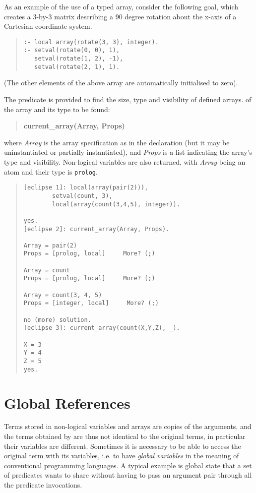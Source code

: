 As an example of the use of a typed array, consider the following goal, which
creates a 3-by-3 matrix describing a 90 degree rotation about the x-axis of
a Cartesian coordinate system.
\begin{quote}\begin{verbatim}
:- local array(rotate(3, 3), integer).
:- setval(rotate(0, 0), 1),
   setval(rotate(1, 2), -1),
   setval(rotate(2, 1), 1).
\end{verbatim}\end{quote}
(The other elements of the above array are automatically initialised to zero).

The predicate 
is provided to find the size, type and visibility of defined arrays.
of the array and its type to be found:
\begin{quote}
{\bf current_array(Array, Props)}
\end{quote}
where {\it Array} is the array specification as in the declaration (but it
may be uninstantiated or partially instantiated), and {\it Props} is
a list indicating the array's type and visibility.
Non-logical variables are also returned, with {\it Array} being an atom and their
type is {\tt prolog}.
\begin{quote}\begin{verbatim}
[eclipse 1]: local(array(pair(2))),
        setval(count, 3),
        local(array(count(3,4,5), integer)).

yes.
[eclipse 2]: current_array(Array, Props).

Array = pair(2)
Props = [prolog, local]     More? (;) 

Array = count
Props = [prolog, local]     More? (;) 

Array = count(3, 4, 5)
Props = [integer, local]     More? (;) 

no (more) solution.
[eclipse 3]: current_array(count(X,Y,Z), _).

X = 3
Y = 4
Z = 5
yes.
\end{verbatim}\end{quote}


\section{Global References}
\label{globrefs}
Terms stored in non-logical variables and arrays are copies of the
 arguments,
and the terms obtained by  are thus not identical
to the original terms, in particular their variables are different.
Sometimes it is necessary to be able
to access the original term with its variables, i.e. to have
{\it global variables} in the meaning of conventional programming
languages.
A typical example is global state that a set of predicates wants to
share without having to pass an argument pair through all the
predicate invocations.

